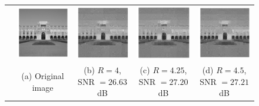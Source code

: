 \begin{figure}[t!]
	\begin{center}
		\setlength{\tabcolsep}{1pt}
		\begin{tabular}{ccccc}
			\rotatebox{90}{$~~~~~~~m=4000$} &
			\includegraphics[width=0.22\linewidth]{./fig/lovett_original.pdf} &
			\includegraphics[width=0.22\linewidth]{./fig/lovett_r4_m_4000_s_800.pdf} & 
			\includegraphics[width=0.22\linewidth]{./fig/lovett_r425_m_4000_s_800.pdf} &
			\includegraphics[width=0.22\linewidth]{./fig/lovett_r450_m_4000_s_800.pdf}  \\
			& \small{(a) Original image}& \small{(b) $R=4$, SNR $=26.63$dB}& \small{(c) $R=4.25$, SNR $=27.20$dB}& \small{(d) $R=4.5$, SNR $=27.21$dB} \\
			

\end{tabular}
\end{center}
\end{figure}
